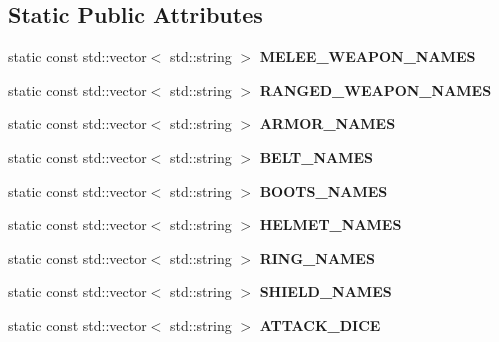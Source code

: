 \subsection*{Static Public Attributes}
\begin{DoxyCompactItemize}
\item 
\hypertarget{class_container_generator_af6c2844bcd120632debcb5a22b739ed0}{}\label{class_container_generator_af6c2844bcd120632debcb5a22b739ed0} 
static const std\+::vector$<$ std\+::string $>$ {\bfseries M\+E\+L\+E\+E\+\_\+\+W\+E\+A\+P\+O\+N\+\_\+\+N\+A\+M\+ES}
\item 
static const std\+::vector$<$ std\+::string $>$ {\bfseries R\+A\+N\+G\+E\+D\+\_\+\+W\+E\+A\+P\+O\+N\+\_\+\+N\+A\+M\+ES}
\item 
\hypertarget{class_container_generator_a3ad6312f547cbb20fccdc8f03492aef4}{}\label{class_container_generator_a3ad6312f547cbb20fccdc8f03492aef4} 
static const std\+::vector$<$ std\+::string $>$ {\bfseries A\+R\+M\+O\+R\+\_\+\+N\+A\+M\+ES}
\item 
\hypertarget{class_container_generator_a6073b19fe6bacafa24cfe65c4b4435e1}{}\label{class_container_generator_a6073b19fe6bacafa24cfe65c4b4435e1} 
static const std\+::vector$<$ std\+::string $>$ {\bfseries B\+E\+L\+T\+\_\+\+N\+A\+M\+ES}
\item 
\hypertarget{class_container_generator_a5eba2f55bec25a7607bf62efb8173f43}{}\label{class_container_generator_a5eba2f55bec25a7607bf62efb8173f43} 
static const std\+::vector$<$ std\+::string $>$ {\bfseries B\+O\+O\+T\+S\+\_\+\+N\+A\+M\+ES}
\item 
\hypertarget{class_container_generator_a7db87925b7690b31239f2f14a87d921d}{}\label{class_container_generator_a7db87925b7690b31239f2f14a87d921d} 
static const std\+::vector$<$ std\+::string $>$ {\bfseries H\+E\+L\+M\+E\+T\+\_\+\+N\+A\+M\+ES}
\item 
\hypertarget{class_container_generator_ab9c84fe949607dc2b8d29135d21e9f2e}{}\label{class_container_generator_ab9c84fe949607dc2b8d29135d21e9f2e} 
static const std\+::vector$<$ std\+::string $>$ {\bfseries R\+I\+N\+G\+\_\+\+N\+A\+M\+ES}
\item 
\hypertarget{class_container_generator_aa19e9803c1ff184a68d61e7ffdec7e27}{}\label{class_container_generator_aa19e9803c1ff184a68d61e7ffdec7e27} 
static const std\+::vector$<$ std\+::string $>$ {\bfseries S\+H\+I\+E\+L\+D\+\_\+\+N\+A\+M\+ES}
\item 
static const std\+::vector$<$ std\+::string $>$ {\bfseries A\+T\+T\+A\+C\+K\+\_\+\+D\+I\+CE}
\end{DoxyCompactItemize}
